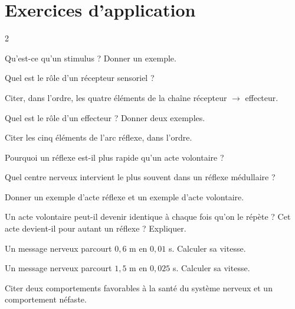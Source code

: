 \section{Exercices d'application}
\begin{multicols}{2}

\exo{} Qu'est-ce qu'un stimulus ? Donner un exemple.

\exo{} Quel est le rôle d'un récepteur sensoriel ?

\exo{} Citer, dans l'ordre, les quatre éléments de la chaîne récepteur $\to$
effecteur.

\exo{} Quel est le rôle d'un effecteur ? Donner deux exemples.

\exo{} Citer les cinq éléments de l'arc réflexe, dans l'ordre.

\exo{} Pourquoi un réflexe est-il plus rapide qu'un acte volontaire ?

\exo{} Quel centre nerveux intervient le plus souvent dans un réflexe médullaire ?

\exo{} Donner un exemple d'acte réflexe et un exemple d'acte volontaire.

\exo{} Un acte volontaire peut-il devenir identique à chaque fois qu'on le
répète ? Cet acte devient-il pour autant un réflexe ? Expliquer.

\exo{} Un message nerveux parcourt $0{,}6$ m en $0{,}01$ s. Calculer sa vitesse.

\exo{} Un message nerveux parcourt $1{,}5$ m en $0{,}025$ s. Calculer sa vitesse.

\exo{} Citer deux comportements favorables à la santé du système nerveux et un
comportement néfaste.

\end{multicols}

